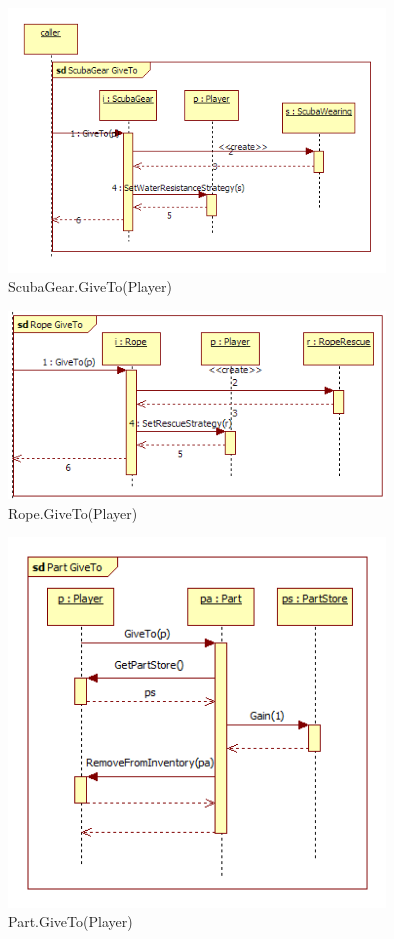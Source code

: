 \begin{figure}[H]
	\begin{center}
		\includegraphics[width=10cm]{chapters/chapter04/seqdiag/ScubaGear_GiveTo.png}
		\caption{ScubaGear.GiveTo(Player)}
		\label{fig:ScubaGearGiveTo}
	\end{center}
\end{figure}
\begin{figure}[H]
	\begin{center}
		\includegraphics[width=10cm]{chapters/chapter04/seqdiag/Rope_GiveTo.png}
		\caption{Rope.GiveTo(Player)}
		\label{fig:RopeGiveTo}
	\end{center}
\end{figure}
\begin{figure}[H]
	\begin{center}
		\includegraphics[width=10cm]{chapters/chapter04/seqdiag/Part_GiveTo.png}
		\caption{Part.GiveTo(Player)}
		\label{fig:PartGiveTo}
	\end{center}
\end{figure}

